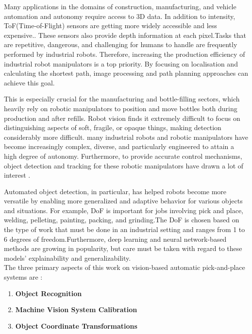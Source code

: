 \documentclass[12pt]{article}
\begin{document}
Many applications in the domains of construction, manufacturing, and vehicle automation and autonomy require access to 3D data. In addition to intensity, ToF(Time-of-Flight) sensors are getting more widely accessible and less expensive.. These sensors also provide depth information at each pixel.Tasks that are repetitive, dangerous, and challenging for humans to handle are frequently performed by industrial robots. Therefore, increasing the production efficiency of industrial robot manipulators is a top priority. By focusing on localisation and calculating the shortest path, image processing and path planning approaches can achieve this goal.  

This is especially crucial for the manufacturing and bottle-filling sectors, which heavily rely on robotic manipulators to position and move bottles both during production and after refills. Robot vision finds it extremely difficult to focus on distinguishing aspects of soft, fragile, or opaque things, making detection considerably more difficult. many industrial robots and robotic manipulators have become increasingly complex, diverse, and particularly engineered to attain a high degree of autonomy. Furthermore, to provide accurate control mechanisms, object detection and tracking for these robotic manipulators have drawn a lot of interest \cite {ref12}.

Automated object detection, in particular, has helped robots become more versatile by enabling more generalized and adaptive behavior for various objects and situations. For example, DoF is important for jobs involving pick and place, welding, pelleting, painting, packing, and grinding.The DoF is chosen based on the type of work that must be done in an industrial setting and ranges from 1 to 6 degrees of freedom.Furthermore, deep learning and neural network-based methods are growing in popularity, but care must be taken with regard to these models' explainability and generalizability\cite{ref12}.\\


The three primary aspects of this work on vision-based automatic pick-and-place systems are \cite{ref12}:
\begin{enumerate}
  \item \textbf{Object Recognition}
  \item \textbf{Machine Vision System Calibration}
  \item \textbf{Object Coordinate Transformations}
\end{enumerate}
\end{document}
